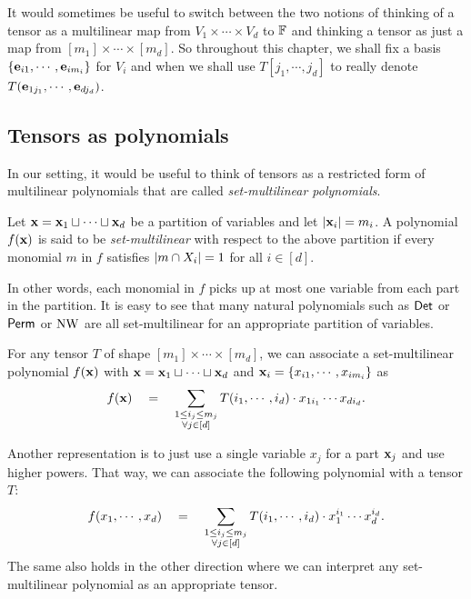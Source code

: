 It would sometimes be useful to switch between the two notions of thinking of a tensor as a multilinear map from $V_1 \times \cdots \times V_d$ to $\mathbb{F}$ and thinking a tensor as just a map from $[m_1] \times \cdots \times [m_d]$.
So throughout this chapter, we shall fix a basis $\left\{\mathbf{e}_{i1},\cdots, \mathbf{e}_{im_i}\right\}$ for $V_i$ and when we shall use $T[j_1,\cdots, j_d]$ to really denote $T(\mathbf{e}_{1j_1},\cdots, \mathbf{e}_{dj_d})$.

\subsection{Tensors as polynomials}

In our setting, it would be useful to think of tensors as a restricted form of multilinear polynomials that are called \emph{set-multilinear polynomials}.

\begin{definition}\label{defn:set-multilinear}
  Let $\mathbf{x} = \mathbf{x}_1 \sqcup \cdots \sqcup \mathbf{x}_d$ be a partition of variables and let $|\mathbf{x}_i| = m_i$.
A polynomial $f(\mathbf{x})$ is said to be \emph{set-multilinear} with respect to the above partition if every monomial $m$ in $f$ satisfies $\left|m \cap X_i\right| = 1$ for all $i \in [d]$.
\end{definition}
In other words, each monomial in $f$ picks up at most one variable from each part in the partition. It is easy to see that many natural polynomials such as $\operatorname{\mathsf{Det}}$ or $\operatorname{\mathsf{Perm}}$ or $\operatorname{\mathrm{NW}}$ are all set-multilinear for an appropriate partition of variables. 

\begin{observation}\label{obs:tensor-to-sml}
  For any tensor $T$ of shape $[m_1] \times \cdots \times [m_d]$, we can associate a set-multilinear polynomial $f(\mathbf{x})$ with $\mathbf{x} = \mathbf{x}_1 \sqcup \cdots \sqcup \mathbf{x}_d$ and $\mathbf{x}_i = \left\{x_{i1}, \cdots, x_{im_i}\right\}$ as
\begin{equation}\label{eqn:tensor-sml}
f(\mathbf{x}) \quad = \quad \sum_{\substack{1 \leq i_j \leq m_j\\ \forall j \in [d]}}  T(i_1,\cdots, i_d) \cdot x_{1i_1}\cdots x_{di_d}.
\end{equation}
\end{observation}

Another representation is to just use a single variable $x_j$ for a part $\mathbf{x}_j$ and use higher powers.
That way, we can associate the following polynomial with a tensor $T$:
\begin{equation}\label{eqn:tensor-to-prod-univariates}
f(x_1,\cdots, x_d) \quad = \quad \sum_{\substack{1 \leq i_j \leq m_j\\ \forall j \in [d]}}  T(i_1,\cdots, i_d) \cdot x_{1}^{i_1}\cdots x_{d}^{i_d}.
\end{equation}
The same also holds in the other direction where we can interpret any set-multilinear polynomial as an appropriate tensor. 


